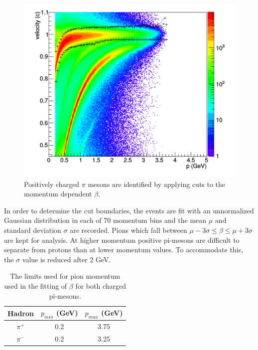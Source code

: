 \begin{figure}
  \centering
  \includegraphics[width=\textwidth]{image/plots/sidis/nathan-pip.png}
  \caption[PID for $\pi^+$ used for the SIDIS analysis]{Positively charged $\pi$ mesons are identified by applying cuts to the momentum dependent $\beta$.}
\end{figure}

In order to determine the cut boundaries, the events are fit with an unnormalized Gaussian distribution in each of 70 momentum bins and the mean $\mu$ and standard deviation $\sigma$ are recorded.  Pions which fall between $\mu - 3\sigma \leq \beta \leq \mu + 3 \sigma$ are kept for analysis.  At higher momentum positive pi-mesons are difficult to separate from protons than at lower momentum values.  To accommodate this, the $\sigma$ value is reduced after 2 GeV.  \\

\begin{table}
	\label{table:hadron-id-nathan}
  \centering
  \begin{tabular}{c|c|c}
    Hadron & $p_{min}$ (GeV) & $p_{max}$ (GeV) \\
    \hline 
	$\pi^+$ & 0.2 & 3.75 \\
	$\pi^-$ & 0.2 & 3.25 \\
  \end{tabular}
  \caption[Limits for pion momentum used in fitting $\beta$.]{The limits used for pion momentum used in the fitting of $\beta$ for both charged pi-mesons.}
\end{table} 
 
